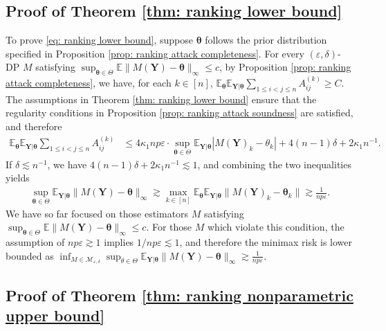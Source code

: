 \documentclass[letterpaper,12pt]{article}
\numberwithin{equation}{section}
\theoremstyle{plain}
\numberwithin{Theorem}{section}
\numberwithin{corollary}{section}
\numberwithin{proposition}{section}
\numberwithin{Lemma}{section}
{
	\theoremstyle{definition}
	\newtheorem{Definition}{Definition}
	\newtheorem{example}{Example}
	\numberwithin{example}{section}
	\newtheorem{fact}{Fact}
	\numberwithin{fact}{section}
	\newtheorem{remark}{Remark}
}
\newcommand{\1}{\mathbbm{1}}
\def\bth{{\boldsymbol{\theta}}}
\def\E{\mathbb{E}}
\begin{document}
\subsection{Proof of Theorem \ref{thm: ranking lower bound}}
\label{sec: proof of thm: ranking lower bound}


To prove \eqref{eq: ranking lower bound}, suppose $\bth$ follows the prior distribution specified in Proposition \ref{prop: ranking attack completeness}. For every $(\varepsilon, \delta)$-DP $M$ satisfying $\sup_{\bth \in \Theta} \E\|M(\bm Y) - \bth\|_\infty \leq c $, by Proposition \ref{prop: ranking attack completeness}, we have, for each $k \in [n]$,  $\E_\bth \E_{\bm Y|\bth} \sum_{1 \leq i < j \leq n} A^{(k)}_{ij} \geq C$.
The assumptions in Theorem \ref{thm: ranking lower bound} ensure that the regularity conditions in Proposition \ref{prop: ranking attack soundness} are satisfied, and therefore 
\begin{align*}
	\E_\bth \E_{\bm Y|\bth} \sum_{1 \leq i < j \leq n} A^{(k)}_{ij} &\leq 4\kappa_1 np\varepsilon \cdot \sup_{\bth \in \Theta} \E_{\bm Y|\bth} |M(\bm Y)_k - \theta_k| + 4 (n-1)\delta + 2\kappa_1 n^{-1}.
\end{align*}
If $\delta \lesssim n^{-1}$, we have $4(n-1)\delta + 2\kappa_1 n^{-1} \lesssim 1$, and combining the two inequalities yields
\begin{align*}
	\sup_{\bth \in \Theta}\E_{\bm Y|\bth}\|M(\bm Y) - \bth\|_\infty
	\gtrsim \max_{k \in [n]} \E_\bth\E_{\bm Y|\bth}\|M(\bm Y)_k - \bth_k\| \gtrsim \frac{1}{np\varepsilon}.
\end{align*}
We have so far focused on those estimators $M$ satisfying $\sup_{\bth \in \Theta} \E\|M(\bm Y) - \bth\|_\infty \leq c$. For those $M$ which violate this condition, the assumption of $np\varepsilon \gtrsim 1$ implies $1/np\varepsilon \lesssim 1$, and therefore the minimax risk is lower bounded as $\inf_{M \in \mathcal M_{\varepsilon, \delta}} \sup_{\theta \in \Theta} \E_{\bm Y|\bth} \|M(\bm Y) - \bth\|_\infty \gtrsim \frac{1}{np\varepsilon}$.

\subsection{Proof of Theorem \ref{thm: ranking nonparametric upper bound}}
\label{sec: proof of thm: ranking nonparametric upper bound}
\end{document}
